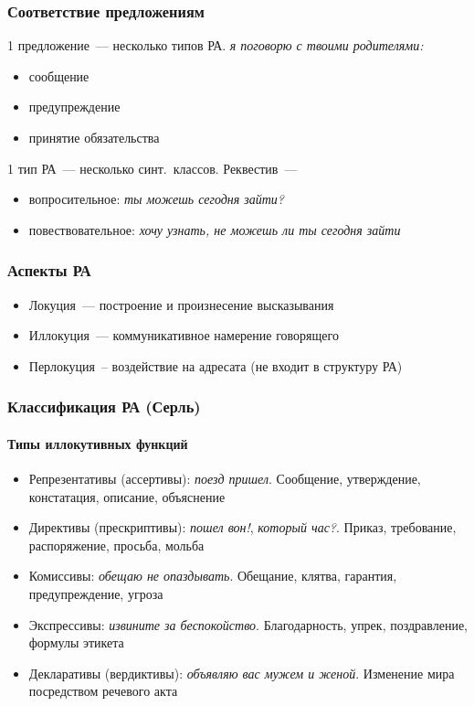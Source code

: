 \begin{frame}
  \frametitle{Соответствие предложениям}

  1 предложение~--- несколько типов РА. \textit{я поговорю с твоими родителями:} \begin{itemize}
    \item сообщение
    \item предупреждение
    \item принятие обязательства
  \end{itemize}

  \vfill

  1 тип РА~--- несколько синт.\ классов. Реквестив~--- \begin{itemize}
    \item вопросительное: \textit{ты можешь сегодня зайти?}
    \item повествовательное: \textit{хочу узнать, не можешь ли ты сегодня зайти}
  \end{itemize}
\end{frame}

\begin{frame}
  \frametitle{Аспекты РА}

  \begin{itemize}
    \item Локуция~--- построение и произнесение высказывания
    \item \alert<2->{Иллокуция}~--- коммуникативное намерение говорящего
    \item Перлокуция~-- воздействие на адресата (не входит в структуру РА)
  \end{itemize}
\end{frame}

\begin{frame}
  \frametitle{Классификация РА (Серль)}
  \framesubtitle{Типы иллокутивных функций}

  \begin{itemize}
    \item Репрезентативы (ассертивы): \textit{поезд пришел}. Сообщение, утверждение, констатация, описание, объяснение
    \item Директивы (прескриптивы): \textit{пошел вон!}, \textit{который час?}. Приказ, требование, распоряжение, просьба, мольба
    \item Комиссивы: \textit{обещаю не опаздывать}. Обещание, клятва, гарантия, предупреждение, угроза
    \item Экспрессивы: \textit{извините за беспокойство}. Благодарность, упрек, поздравление, формулы этикета
    \item Декларативы (вердиктивы): \textit{объявляю вас мужем и женой}. Изменение мира посредством речевого акта
  \end{itemize}
\end{frame}

